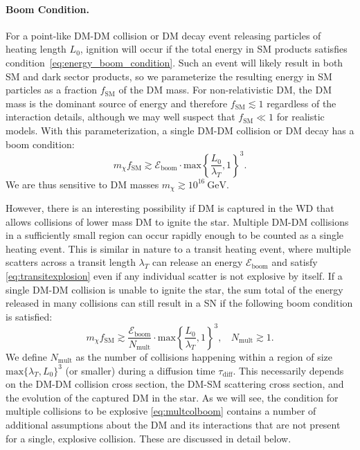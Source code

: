 \documentclass[preprintnumbers,amsmath,amssymb,prd,superscriptaddress]{revtex4}
\newcommand{\Eboom}{\mathcal{E}_\text{boom}}
\newcommand{\GeV}{\text{GeV}}
\begin{document}
\paragraph{Boom Condition.}
For a point-like DM-DM collision or DM decay event releasing particles of heating length $L_0$, ignition will occur if the total energy in SM products satisfies condition~\eqref{eq:energy_boom_condition}.
Such an event will likely result in both SM and dark sector products, so we parameterize the resulting energy in SM particles as a fraction $f_\text{SM}$ of the DM mass.
For non-relativistic DM, the DM mass is the dominant source of energy and therefore $f_\text{SM} \lesssim 1$ regardless of the interaction details, although we may well suspect that $f_\text{SM} \ll 1$ for realistic models.
With this parameterization, a single DM-DM collision or DM decay has a boom condition:
\begin{equation}
\label{eq:coldecay}
  m_\chi f_\text{SM}  \gtrsim \Eboom \cdot \text{max} \left \{\frac{L_0}{\lambda_T}, 1 \right \}^3.
\end{equation}
We are thus sensitive to DM masses $m_\chi \gtrsim 10^{16} ~\GeV$.

However, there is an interesting possibility if DM is captured in the WD that allows collisions of lower mass DM to ignite the star. 
Multiple DM-DM collisions in a sufficiently small region can occur rapidly enough to be counted as a single heating event.
This is similar in nature to a transit heating event, where multiple scatters across a transit length $\lambda_T$ can release an energy $\Eboom$ and satisfy \eqref{eq:transitexplosion} even if any individual scatter is not explosive by itself.   
If a single DM-DM collision is unable to ignite the star, the sum total of the energy released in many collisions can still result in a SN if the following boom condition is satisfied:
\begin{equation}
\label{eq:multcolboom}
 m_\chi f_\text{SM}  \gtrsim \frac{\Eboom}{N_\text{mult}} \cdot \text{max} \left \{\frac{L_0}{\lambda_T}, 1 \right \}^3, ~~~~ N_\text{mult} \gtrsim 1. 
\end{equation}
We define $N_\text{mult}$ as the number of collisions happening within a region of size $\text{max}\{\lambda_T,L_0\}^3$ (or smaller) during a diffusion time $\tau_\text{diff}$.
This necessarily depends on the DM-DM collision cross section, the DM-SM scattering cross section, and the evolution of the captured DM in the star. 
As we will see, the condition for multiple collisions to be explosive \eqref{eq:multcolboom} contains a number of additional assumptions about the DM and its interactions that are not present for a single, explosive collision. 
These are discussed in detail below. 
\end{document}
